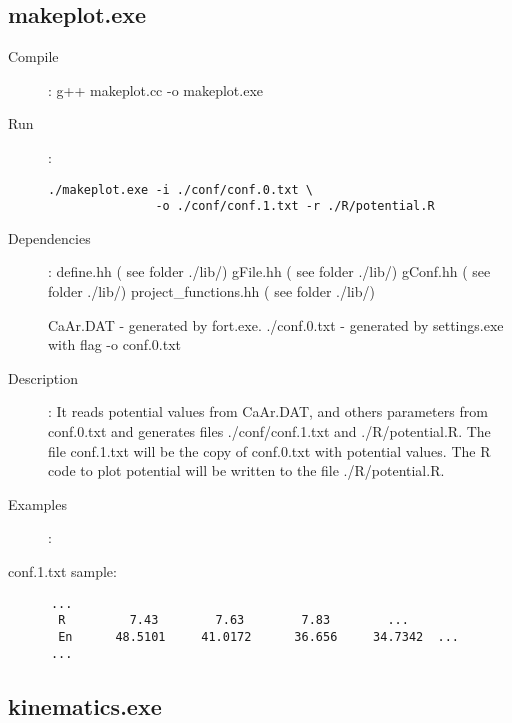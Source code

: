 \documentclass[preprint,review,12pt]{elsarticle}
\begin{document}
  \subsection{makeplot.exe}
  \label{sec:makeplot}
    \begin{description}
       \item[Compile]:  g++ makeplot.cc -o makeplot.exe
       \item[Run]:
    \begin{verbatim}
./makeplot.exe -i ./conf/conf.0.txt \
               -o ./conf/conf.1.txt -r ./R/potential.R
    \end{verbatim}  

     
       \item [Dependencies]:
           \subitem define.hh              ( see folder ./lib/)
           \subitem gFile.hh               ( see folder ./lib/)
           \subitem gConf.hh               ( see folder ./lib/)
           \subitem project\_functions.hh   ( see folder ./lib/)

           \subitem CaAr.DAT - generated by fort.exe. 
           \subitem ./conf.0.txt  - generated by settings.exe with flag -o conf.0.txt  
           
       \item [Description]:
          It reads potential values from CaAr.DAT, and others parameters from conf.0.txt and generates files ./conf/conf.1.txt and ./R/potential.R. 
          The file conf.1.txt will be the copy of conf.0.txt with potential values. The R code to plot potential will be written to the file ./R/potential.R.
          
       \item [Examples]:
    \end{description}
      conf.1.txt sample:
    \begin{verbatim}
      ...
       R         7.43        7.63        7.83        ...
       En      48.5101     41.0172      36.656     34.7342  ...
      ...
    \end{verbatim}  


  \subsection{kinematics.exe}
  \label{sec:potential}
\end{document}
